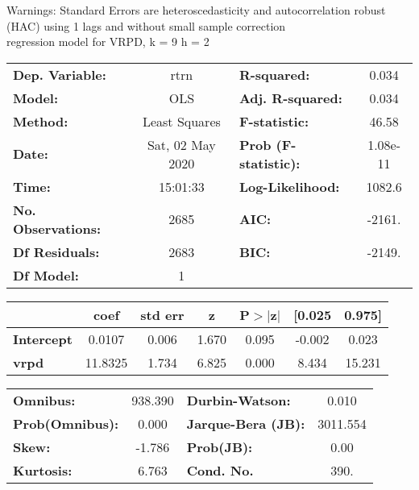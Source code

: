 Warnings: \newline
 [1] Standard Errors are heteroscedasticity and autocorrelation robust (HAC) using 1 lags and without small sample correction\\ 

regression model for VRPD, k = 9 h = 2\begin{center}
\begin{tabular}{lclc}
\toprule
\textbf{Dep. Variable:}    &       rtrn       & \textbf{  R-squared:         } &     0.034   \\
\textbf{Model:}            &       OLS        & \textbf{  Adj. R-squared:    } &     0.034   \\
\textbf{Method:}           &  Least Squares   & \textbf{  F-statistic:       } &     46.58   \\
\textbf{Date:}             & Sat, 02 May 2020 & \textbf{  Prob (F-statistic):} &  1.08e-11   \\
\textbf{Time:}             &     15:01:33     & \textbf{  Log-Likelihood:    } &    1082.6   \\
\textbf{No. Observations:} &        2685      & \textbf{  AIC:               } &    -2161.   \\
\textbf{Df Residuals:}     &        2683      & \textbf{  BIC:               } &    -2149.   \\
\textbf{Df Model:}         &           1      & \textbf{                     } &             \\
\bottomrule
\end{tabular}
\begin{tabular}{lcccccc}
                   & \textbf{coef} & \textbf{std err} & \textbf{z} & \textbf{P$> |$z$|$} & \textbf{[0.025} & \textbf{0.975]}  \\
\midrule
\textbf{Intercept} &       0.0107  &        0.006     &     1.670  &         0.095        &       -0.002    &        0.023     \\
\textbf{vrpd}      &      11.8325  &        1.734     &     6.825  &         0.000        &        8.434    &       15.231     \\
\bottomrule
\end{tabular}
\begin{tabular}{lclc}
\textbf{Omnibus:}       & 938.390 & \textbf{  Durbin-Watson:     } &    0.010  \\
\textbf{Prob(Omnibus):} &   0.000 & \textbf{  Jarque-Bera (JB):  } & 3011.554  \\
\textbf{Skew:}          &  -1.786 & \textbf{  Prob(JB):          } &     0.00  \\
\textbf{Kurtosis:}      &   6.763 & \textbf{  Cond. No.          } &     390.  \\
\bottomrule
\end{tabular}
\end{center}

